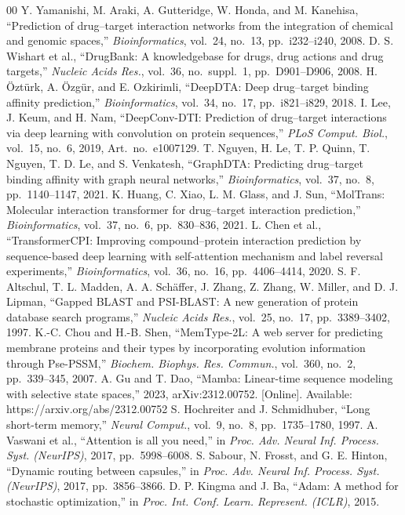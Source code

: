 \documentclass[conference]{IEEEtran}
\begin{document}
\begin{thebibliography}{00}
 Y. Yamanishi, M. Araki, A. Gutteridge, W. Honda, and M.
Kanehisa, ``Prediction of drug--target interaction networks from the integration
of chemical and genomic spaces,'' \emph{Bioinformatics}, vol.~24, no.~13,
pp.~i232--i240, 2008.
 D. S. Wishart et al., ``DrugBank: A knowledgebase for
drugs, drug actions and drug targets,'' \emph{Nucleic Acids Res.}, vol.~36,
no.~suppl.~1, pp.~D901--D906, 2008.
 H. \"Ozt\"urk, A. \"Ozg\"ur, and E. Ozkirimli, ``DeepDTA:
Deep drug--target binding affinity prediction,'' \emph{Bioinformatics}, vol.~34,
no.~17, pp.~i821--i829, 2018.
 I. Lee, J. Keum, and H. Nam, ``DeepConv-DTI: Prediction
of drug--target interactions via deep learning with convolution on protein
sequences,'' \emph{PLoS Comput. Biol.}, vol.~15, no.~6, 2019, Art.~no.~e1007129.
 T. Nguyen, H. Le, T. P. Quinn, T. Nguyen, T. D. Le, and S.
Venkatesh, ``GraphDTA: Predicting drug--target binding affinity with graph neural
networks,'' \emph{Bioinformatics}, vol.~37, no.~8, pp.~1140--1147, 2021.
 K. Huang, C. Xiao, L. M. Glass, and J. Sun, ``MolTrans:
Molecular interaction transformer for drug--target interaction prediction,''
\emph{Bioinformatics}, vol.~37, no.~6, pp.~830--836, 2021.
 L. Chen et al., ``TransformerCPI: Improving
compound--protein interaction prediction by sequence-based deep learning with
self-attention mechanism and label reversal experiments,''
\emph{Bioinformatics}, vol.~36, no.~16, pp.~4406--4414, 2020.
 S. F. Altschul, T. L. Madden, A. A. Sch\"affer, J. Zhang,
Z. Zhang, W. Miller, and D. J. Lipman, ``Gapped BLAST and PSI-BLAST: A new
generation of protein database search programs,'' \emph{Nucleic Acids Res.},
vol.~25, no.~17, pp.~3389--3402, 1997.
 K.-C. Chou and H.-B. Shen, ``MemType-2L: A web server for
predicting membrane proteins and their types by incorporating evolution
information through Pse-PSSM,'' \emph{Biochem. Biophys. Res. Commun.}, vol.~360,
no.~2, pp.~339--345, 2007.
 A. Gu and T. Dao, ``Mamba: Linear-time sequence modeling with
selective state spaces,'' 2023, arXiv:2312.00752. [Online]. Available:
https://arxiv.org/abs/2312.00752
 S. Hochreiter and J. Schmidhuber, ``Long short-term memory,''
\emph{Neural Comput.}, vol.~9, no.~8, pp.~1735--1780, 1997.
 A. Vaswani et al., ``Attention is all you need,'' in
\emph{Proc. Adv. Neural Inf. Process. Syst. (NeurIPS)}, 2017, pp.~5998--6008.
 S. Sabour, N. Frosst, and G. E. Hinton, ``Dynamic routing
between capsules,'' in \emph{Proc. Adv. Neural Inf. Process. Syst. (NeurIPS)},
2017, pp.~3856--3866.
 D. P. Kingma and J. Ba, ``Adam: A method for stochastic
optimization,'' in \emph{Proc. Int. Conf. Learn. Represent. (ICLR)}, 2015.
\end{thebibliography}
\end{document}
